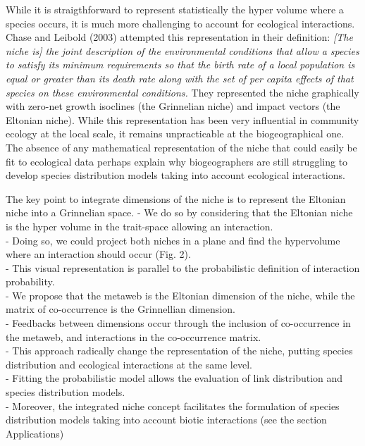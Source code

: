 \documentclass[12pt]{article}
\begin{document}
While it is straigthforward to represent statistically the hyper volume where a species
occurs, it is much more challenging to account for ecological interactions.
Chase and Leibold (2003) attempted this representation in their definition:
\textit{[The niche is] the joint description of the environmental conditions
that allow a species to satisfy its minimum requirements so that the birth rate
of a local population is equal or greater than its death rate along with the set
of per capita effects of that species on these environmental conditions.} They
represented the niche graphically with zero-net growth isoclines (the Grinnelian
niche) and impact vectors (the Eltonian niche). While this representation has
been very influential in community ecology at the local scale, it remains
unpracticable at the biogeographical one. The absence of any mathematical
representation of the niche that could easily be fit to ecological data perhaps
explain why biogeographers are still struggling to develop species distribution
models taking into account ecological interactions.

The key point to integrate dimensions of the niche is to represent the Eltonian niche into a Grinnelian space. 
- We do so by considering that the Eltonian niche is the hyper volume in the trait-space allowing an interaction. \\
- Doing so, we could project both niches in a plane and find the hypervolume where an interaction should occur (Fig. 2). \\
- This visual representation is parallel to the probabilistic definition of interaction probability. \\
- We propose that the metaweb is the Eltonian dimension of the niche, while the matrix of co-occurrence is the Grinnellian dimension. \\
- Feedbacks between dimensions occur through the inclusion of co-occurrence in the metaweb, and interactions in the co-occurrence matrix. \\
- This approach radically change the representation of the niche, putting species distribution and ecological interactions at the same level. \\
- Fitting the probabilistic model allows the evaluation of link distribution and species distribution models. \\
- Moreover, the integrated niche concept facilitates the formulation of species distribution models taking into account biotic interactions (see the section Applications) \\
\end{document}
